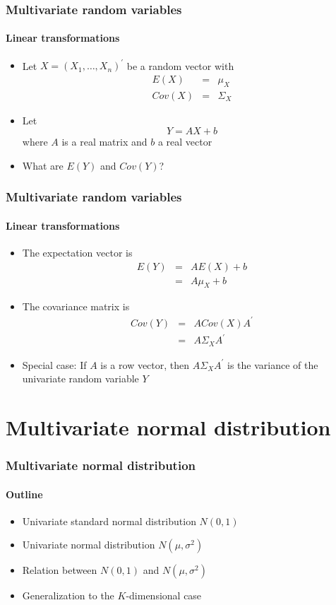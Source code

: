 \documentclass[notes=show]{beamer}
\begin{document}
\begin{frame}\frametitle{Multivariate random variables}\framesubtitle{Linear transformations}
\begin{itemize}
    \item Let $X=\left( X_{1},\ldots ,X_{n}\right) ^{\prime }$ be a random vector with
        \begin{eqnarray*}
            E\left( X\right) &=&\mu _{X} \\
            Cov\left( X\right) &=&\Sigma _{X}
        \end{eqnarray*}
    \item Let
        \begin{equation*}
            Y=AX+b
        \end{equation*}
        where $A$ is a real matrix and $b$ a real vector
    \item What are $E\left( Y\right) $ and $Cov\left( Y\right) $?
\end{itemize}
\end{frame}


\begin{frame}\frametitle{Multivariate random variables}\framesubtitle{Linear transformations}
\begin{itemize}
    \item The expectation vector is
        \begin{eqnarray*}
            E(Y) &=&AE(X)+b \\
            &=&A\mu _{X}+b
        \end{eqnarray*}
    \item The covariance matrix is
        \begin{eqnarray*}
            Cov(Y) &=&ACov(X)A^{\prime } \\
            &=&A\Sigma _{X}A^{\prime }
        \end{eqnarray*}
    \item Special case: If $A$ is a row vector, then $A\Sigma _{X}A^{\prime }$ is the variance of the univariate random variable $Y$
\end{itemize}
\end{frame}



\section{Multivariate normal distribution}

\begin{frame}\frametitle{Multivariate normal distribution}\framesubtitle{Outline}
\begin{itemize}
    \item Univariate standard normal distribution $N(0,1)$
    \item Univariate normal distribution $N(\mu ,\sigma ^{2})$
    \item Relation between $N(0,1)$ and $N(\mu ,\sigma ^{2})$
    \item Generalization to the $K$-dimensional case
\end{itemize}
\end{frame}
\end{document}

